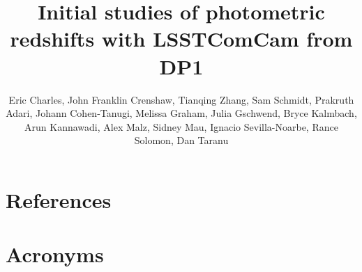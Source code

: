 \documentclass[SE,lsstdraft,authoryear,toc]{lsstdoc}
\title{Initial studies of photometric redshifts with LSSTComCam from DP1}
\author{%
  Eric Charles,
  John Franklin Crenshaw,
  Tianqing Zhang, 
  Sam Schmidt,
  Prakruth Adari, 
  Johann Cohen-Tanugi,
  Melissa Graham,
  Julia Gschwend,
  Bryce Kalmbach,
  Arun Kannawadi,
  Alex Malz,
  Sidney Mau,
  Ignacio Sevilla-Noarbe,
  Rance Solomon,
  Dan Taranu
}
\date{\vcsDate}
\begin{document}
\maketitle




\appendix




\section{References} \label{sec:bib}
\renewcommand{\refname}{} %


\section{Acronyms} \label{sec:acronyms}

\end{document}
